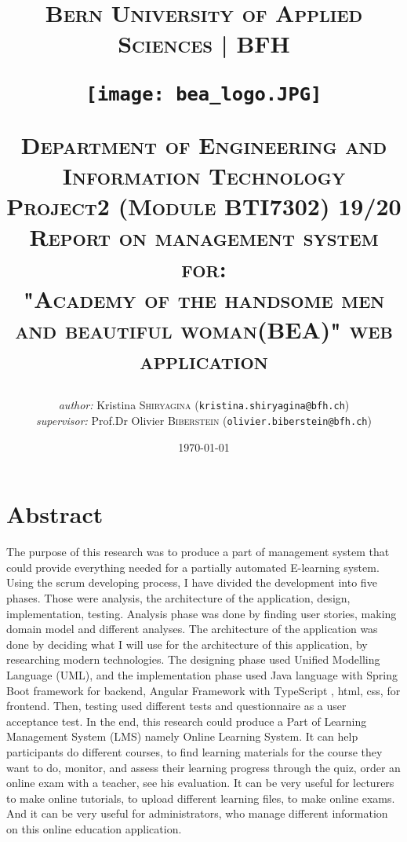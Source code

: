 \documentclass{scrartcl}
\begin{document}
\begin{titlepage}


\title{\textsc{\LARGE Bern University of Applied Sciences | BFH }\\[1cm]
\begin{center}
\texttt{[image: bea\_logo.JPG]}
\end{center}
\textsc{\small Department of Engineering and Information Technology}\\
\textsc{\small Project2 (Module BTI7302) 19/20}\\[1cm]
\textsc{\small Report on management system for: }\\
\textsc{"Academy of the handsome men and beautiful woman(BEA)" web application}}
\date{\today}   %
\author{\textit{author: }Kristina \textsc{Shiryagina} (\texttt{kristina.shiryagina@bfh.ch}) \\
 \textit{supervisor: } Prof.Dr Olivier  \textsc{Biberstein}  (\texttt{olivier.biberstein@bfh.ch})\\
 }
\maketitle	
	
\tableofcontents
\clearpage
\end{titlepage}


\section{Abstract}
The purpose of this research was to produce a  part of  management system that could provide everything needed for a partially automated  E-learning system. Using the scrum developing process, I have divided the development into five phases. Those were analysis, the architecture of the application, design, implementation, testing. Analysis phase was done by finding user stories, making domain model and different analyses. The architecture of the application was done by deciding what I will use for the architecture of this application, by researching modern technologies. The designing phase used Unified Modelling Language (UML), and the implementation phase used Java language with Spring Boot framework for backend, Angular Framework with TypeScript , html, css, for frontend. Then, testing used different tests and questionnaire as a user acceptance test. In the end, this research could produce a Part of Learning Management System (LMS) namely Online Learning System. It can help participants do different courses, to find learning materials for the course they want to do, monitor, and assess their learning progress through the quiz, order an online exam with a teacher, see his evaluation. It can be very useful for lecturers to make online tutorials, to upload different learning files, to make online exams. And it can be very useful for administrators, who manage different information on this online education application.
\end{document}
